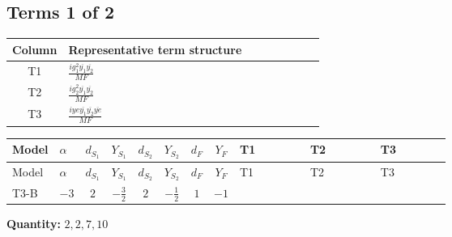 \documentclass[8pt]{article}
\begin{document}
\begin{landscape}
\subsection*{Terms 1 of 2}
\begin{center}
\begin{tabular}{@{}c >{\raggedright\arraybackslash}p{0.82\linewidth}@{}}
\toprule
Column & Representative term structure \\
\midrule
T1 & \(\displaystyle \frac{i g_{1}^{2} \overline{y_{1}} \overline{y_{2}}}{MF}\) \\
\midrule
T2 & \(\displaystyle \frac{i g_{2}^{2} \overline{y_{1}} \overline{y_{2}}}{MF}\) \\
\midrule
T3 & \(\displaystyle \frac{i ye \overline{y_{1}} \overline{y_{2}} \overline{ye}}{MF}\) \\
\midrule
\bottomrule
\end{tabular}
\end{center}
\smallskip
\tiny
\begin{longtable}{@{}llcccccc >{\raggedright\arraybackslash}p{0.21\linewidth} >{\raggedright\arraybackslash}p{0.21\linewidth} >{\raggedright\arraybackslash}p{0.21\linewidth}@{}}
\toprule
Model & $\alpha$ & $d_{S_1}$ & $Y_{S_1}$ & $d_{S_2}$ & $Y_{S_2}$ & $d_F$ & $Y_F$ & T1 & T2 & T3 \\
\midrule
\endfirsthead
\toprule
Model & $\alpha$ & $d_{S_1}$ & $Y_{S_1}$ & $d_{S_2}$ & $Y_{S_2}$ & $d_F$ & $Y_F$ & T1 & T2 & T3 \\
\midrule
\endhead
T3-B & $-3$ & $2$ & $-\frac{3}{2}$ & $2$ & $-\frac{1}{2}$ & $1$ & $-1$ & \scriptsize\adjustbox{max width=\linewidth}{$\begin{gathered} \frac{3 i g_{1}^{2} \overline{y_{1}} \overline{y_{2}}}{2 MF}\end{gathered}$} & \scriptsize\adjustbox{max width=\linewidth}{$\begin{gathered} \frac{3 i g_{2}^{2} \overline{y_{1}} \overline{y_{2}}}{4 MF}\end{gathered}$} & \scriptsize\adjustbox{max width=\linewidth}{$\begin{gathered} - \frac{i ye \overline{y_{1}} \overline{y_{2}} \overline{ye}}{4 MF}\end{gathered}$} \\
\midrule
\bottomrule
\end{longtable}
\clearpage
\noindent\textbf{Quantity: }$\mathrm{2,2,7,10}$\par\smallskip

\end{landscape}
\end{document}
